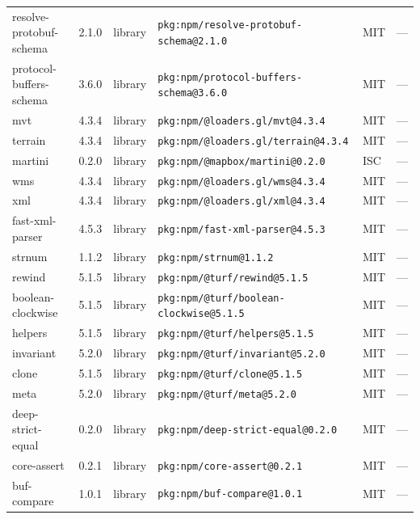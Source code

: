 \documentclass[11pt,a4paper]{article}
\begin{document}
\begin{longtable}{|p{4cm}|p{2cm}|p{1.6cm}|p{5cm}|p{1.5cm}|p{3.5cm}|}
\raggedright resolve-protobuf-schema & 2.1.0 & library & \small\texttt{pkg:npm/resolve-protobuf-schema@2.1.0} & MIT & \small — \\
\raggedright protocol-buffers-schema & 3.6.0 & library & \small\texttt{pkg:npm/protocol-buffers-schema@3.6.0} & MIT & \small — \\
\raggedright mvt & 4.3.4 & library & \small\texttt{pkg:npm/@loaders.gl/mvt@4.3.4} & MIT & \small — \\
\raggedright terrain & 4.3.4 & library & \small\texttt{pkg:npm/@loaders.gl/terrain@4.3.4} & MIT & \small — \\
\raggedright martini & 0.2.0 & library & \small\texttt{pkg:npm/@mapbox/martini@0.2.0} & ISC & \small — \\
\raggedright wms & 4.3.4 & library & \small\texttt{pkg:npm/@loaders.gl/wms@4.3.4} & MIT & \small — \\
\raggedright xml & 4.3.4 & library & \small\texttt{pkg:npm/@loaders.gl/xml@4.3.4} & MIT & \small — \\
\raggedright fast-xml-parser & 4.5.3 & library & \small\texttt{pkg:npm/fast-xml-parser@4.5.3} & MIT & \small — \\
\raggedright strnum & 1.1.2 & library & \small\texttt{pkg:npm/strnum@1.1.2} & MIT & \small — \\
\raggedright rewind & 5.1.5 & library & \small\texttt{pkg:npm/@turf/rewind@5.1.5} & MIT & \small — \\
\raggedright boolean-clockwise & 5.1.5 & library & \small\texttt{pkg:npm/@turf/boolean-clockwise@5.1.5} & MIT & \small — \\
\raggedright helpers & 5.1.5 & library & \small\texttt{pkg:npm/@turf/helpers@5.1.5} & MIT & \small — \\
\raggedright invariant & 5.2.0 & library & \small\texttt{pkg:npm/@turf/invariant@5.2.0} & MIT & \small — \\
\raggedright clone & 5.1.5 & library & \small\texttt{pkg:npm/@turf/clone@5.1.5} & MIT & \small — \\
\raggedright meta & 5.2.0 & library & \small\texttt{pkg:npm/@turf/meta@5.2.0} & MIT & \small — \\
\raggedright deep-strict-equal & 0.2.0 & library & \small\texttt{pkg:npm/deep-strict-equal@0.2.0} & MIT & \small — \\
\raggedright core-assert & 0.2.1 & library & \small\texttt{pkg:npm/core-assert@0.2.1} & MIT & \small — \\
\raggedright buf-compare & 1.0.1 & library & \small\texttt{pkg:npm/buf-compare@1.0.1} & MIT & \small — \\

\end{longtable}
\end{document}
